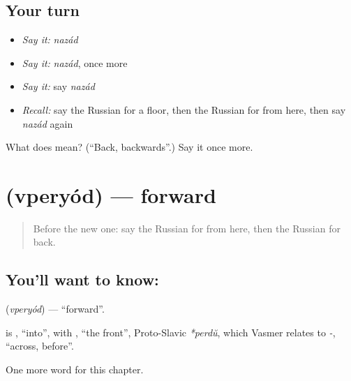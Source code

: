 \subsection*{Your turn}
\begin{itemize}
\raggedright
  \item \emph{Say it:} \emph{nazád}
  \item \emph{Say it:} \emph{nazád}, once more
  \item \emph{Say it:} say \emph{nazád}
  \item \emph{Recall:} say the Russian for a floor, then the Russian for from here, then say \emph{nazád} again
\end{itemize}

\begin{tcolorbox}[breakable,colback=teal!4,colframe=teal!35!black,title={Before you move on}]
What does  mean? (\textquotedblleft{}Back, backwards\textquotedblright{}.) Say it once more.
\end{tcolorbox}
\section[\texorpdfstring{\ru{вперёд} (vperyód)}{вперёд (vperyód)}]{ (vperyód) — forward}

\label{lesson:RU-C214-vperyod}



\begin{quote}
Before the new one: say the Russian for from here, then the Russian for back.
\end{quote}

\subsection*{You'll want to know: }
\textbf{} (\emph{vperyód}) — \textquotedblleft{}forward\textquotedblright{}.

\begin{cousinweb}
\textbf{} is \emph{}, \textquotedblleft{}into\textquotedblright{}, with \emph{}, \textquotedblleft{}the front\textquotedblright{}, Proto-Slavic \emph{*perdŭ}, which Vasmer relates to \emph{-}, \textquotedblleft{}across, before\textquotedblright{}.
\end{cousinweb}

\begin{grammarlens}[title={What you've built}]
One more word for this chapter.
\end{grammarlens}

